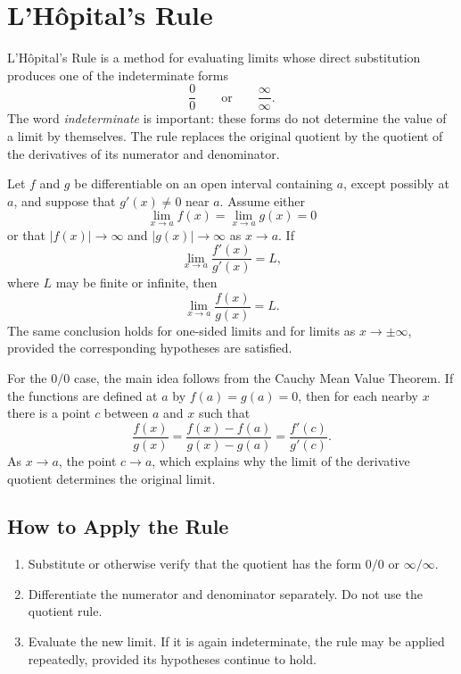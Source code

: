 \section{L'H\^{o}pital's Rule}

L'H\^{o}pital's Rule is a method for evaluating limits whose direct
substitution produces one of the indeterminate forms
\[
    \frac{0}{0}
    \qquad\text{or}\qquad
    \frac{\infty}{\infty}.
\]
The word \emph{indeterminate} is important: these forms do not determine the
value of a limit by themselves.  The rule replaces the original quotient by
the quotient of the derivatives of its numerator and denominator.

\begin{theorem}
    Let \(f\) and \(g\) be differentiable on an open interval containing
    \(a\), except possibly at \(a\), and suppose that \(g'(x)\neq0\) near
    \(a\).  Assume either
    \[
        \lim_{x\to a}f(x)=\lim_{x\to a}g(x)=0
    \]
    or that \(\lvert f(x)\rvert\to\infty\) and
    \(\lvert g(x)\rvert\to\infty\) as \(x\to a\).  If
    \[
        \lim_{x\to a}\frac{f'(x)}{g'(x)}=L,
    \]
    where \(L\) may be finite or infinite, then
    \[
        \lim_{x\to a}\frac{f(x)}{g(x)}=L.
    \]
    The same conclusion holds for one-sided limits and for limits as
    \(x\to\pm\infty\), provided the corresponding hypotheses are satisfied.
\end{theorem}

For the \(0/0\) case, the main idea follows from the Cauchy Mean Value
Theorem.  If the functions are defined at \(a\) by \(f(a)=g(a)=0\), then for
each nearby \(x\) there is a point \(c\) between \(a\) and \(x\) such that
\[
    \frac{f(x)}{g(x)}
    =\frac{f(x)-f(a)}{g(x)-g(a)}
    =\frac{f'(c)}{g'(c)}.
\]
As \(x\to a\), the point \(c\to a\), which explains why the limit of the
derivative quotient determines the original limit.

\subsection{How to Apply the Rule}

\begin{enumerate}
    \item Substitute or otherwise verify that the quotient has the form
    \(0/0\) or \(\infty/\infty\).
    \item Differentiate the numerator and denominator separately.  Do not
    use the quotient rule.
    \item Evaluate the new limit.  If it is again indeterminate, the rule
    may be applied repeatedly, provided its hypotheses continue to hold.
\end{enumerate}

